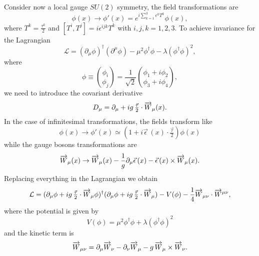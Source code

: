 Consider now a local gauge $SU(2)$ symmetry, the field transformations
are
\begin{equation}
  \label{eq:32}
  \phi(x) \rightarrow \phi'(x) = e^{i \textstyle{\sum_{k = 1}^{3}}
    \epsilon^{k} T^{k}} \phi(x),
\end{equation}
where $T^{k} = \frac{\tau^{k}}{2}$ and $[T^{i},T^{j}] = i
\epsilon^{ijk}T^{k}$ with $i,j,k = 1,2,3$. To achieve invariance for
the Lagrangian
\begin{equation}
  \label{eq:33}
  \mathcal{L} =(\partial_{\mu} \phi)^{\dagger}(\partial^{\mu} \phi) -
  \mu^{2}\phi^{\dagger}\phi - \lambda (\phi^{\dagger}\phi)^{2},
\end{equation}
where
\begin{equation}
  \label{eq:34}
  \phi \equiv \binom{\phi_{i}}{\phi_{j}} = \frac{1}{\sqrt{2}}
  \binom{\phi_{1} + i \phi_{2}}{\phi_{3} + i \phi_{4}},
\end{equation}
we need to introduce the covariant derivative
\begin{equation}
  \label{eq:35}
  D_{\mu} = \partial_{\mu} + i g\,\tfrac{\vec \tau}{2} \cdot \overrightarrow{W}_{\mu}(x).
\end{equation}
In the case of infinitesimal transformations, the fields transform
like
\begin{equation}
  \label{eq:36}
  \phi(x) \rightarrow \phi'(x) \simeq ( 1 + i \vec \epsilon\, (x) \cdot
  \tfrac{\vec \tau}{2}) \phi(x)
\end{equation}
while the gauge bosons transformations are
\begin{equation}
  \label{eq:37}
  \overrightarrow{W}_{\mu} (x) \rightarrow \overrightarrow{W}_{\mu}(x) -
  \frac{1}{g} \partial_{\mu} \vec \epsilon \, (x) - \vec \epsilon\,(x)
  \times \overrightarrow{W}_{\mu} (x).
\end{equation}
Replacing everything in the Lagrangian we obtain
\begin{equation}
  \label{eq:38}
  \mathcal{L} = ( \partial_{\mu} \phi + i g\,\tfrac{\vec \tau}{2}
  \cdot \overrightarrow{W}_{\mu} \phi)^{\dagger} (\partial_{\mu} \phi + i
  g\,\tfrac{\vec \tau}{2} \cdot \overrightarrow{W}_{\mu}) - V(\phi) -
  \frac{1}{4} \overrightarrow{W}_{\mu\nu} \cdot \overrightarrow{W}^{\mu\nu},
\end{equation}
where the potential is given by
\begin{equation}
  \label{Esq:40}
  V(\phi) = \mu^{2} \phi^{\dagger} \phi + \lambda(\phi^{\dagger} \phi)^{2}
\end{equation}
and the kinetic term is
\begin{equation}
  \label{eq:39}
  \overrightarrow{W}_{\mu\nu} = \partial_{\mu} \overrightarrow{W}_{\nu} - \partial_{\nu} \overrightarrow{W}_{\mu}
  - g\,\overrightarrow{W}_{\mu} \times \overrightarrow{W}_{\nu}.
\end{equation}

